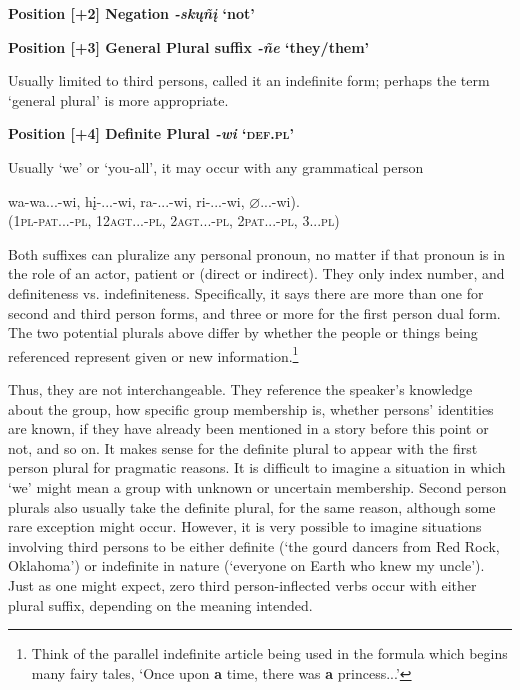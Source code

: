 \documentclass[output=paper]{LSP/langsci}
\begin{document}
\textbf{Position [+2]  Negation  \textit{-sk\k{u}ñ\k{i}}  `not' }	
\vspace{1em}
	   	      						     
\textbf{Position [+3]  General Plural suffix  \textit{-ñe}  `they/them'} 

Usually limited to third persons, \citet{Whitman1947} called it an indefinite form; perhaps the term `general plural' is more appropriate.  

\vspace{1em}
\textbf{Position [+4] Definite Plural \textit{-wi}  `\textsc{def.pl}'}

 Usually `we' or `you-all', it may occur with any grammatical person  
 \begin{exe} 
 \ex \gll wa-wa...-wi, { }  h\k{i}-...-wi, { }     ra-...-wi, { } ri-...-wi, { } $\varnothing$...-wi).  \\
            (1\textsc{pl}-\textsc{pat}...-\textsc{pl}, { } 12\textsc{agt}...-\textsc{pl}, { }    2\textsc{agt}...-\textsc{pl}, { } 2\textsc{pat}...-\textsc{pl}, { } 3...\textsc{pl})  \\
\end{exe}            

Both suffixes can pluralize any personal pronoun, no matter if that pronoun is in the role of an actor, patient or  (direct or indirect).  They only index number, and definiteness vs. indefiniteness.  Specifically, it says there are more than one for second and third person forms, and three or more for the first person dual form. The two potential plurals above differ by whether the people or things being referenced represent given or new information.\footnote{Think of the parallel indefinite article being used in the formula which begins many  fairy tales, `Once upon \textbf{a} time, there was \textbf{a} princess...'}   

Thus, they are not interchangeable.  They reference the speaker's knowledge about the group, how specific group membership is, whether persons' identities are known, if they have already been mentioned in a story before this point or not, and so on.  It makes sense for the definite plural to appear with the first person plural for pragmatic reasons.  It is difficult to imagine a situation in which `we' might mean a group with unknown or uncertain membership.  Second person plurals also usually take the definite plural, for the same reason, although some rare exception might occur.  However, it is very possible to imagine situations involving third persons to be either definite (`the gourd dancers from Red Rock, Oklahoma') or indefinite in nature (`everyone on Earth who knew my uncle').  Just as one might expect, zero third person-inflected verbs occur with either plural suffix, depending on the meaning intended. 
\end{document}
